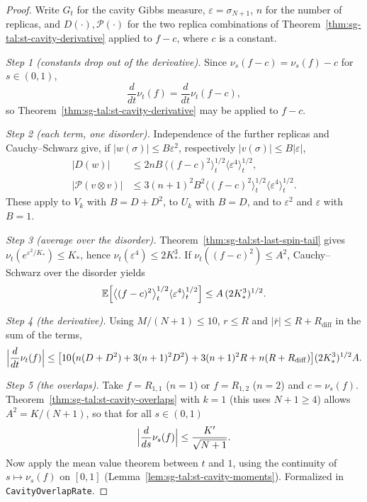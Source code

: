 \begin{proof}
  \leanok
Write $G_t$ for the cavity Gibbs measure, $\varepsilon=\sigma_{N+1}$, $n$ for the number of replicas, and
$D(\cdot),\mathcal P(\cdot)$ for the two replica combinations of
Theorem~\ref{thm:sg-tal:st-cavity-derivative} applied to $f-c$, where $c$ is a constant.

\emph{Step 1 (constants drop out of the derivative).} Since $\nu_s(f-c)=\nu_s(f)-c$ for $s\in(0,1)$,
\[
\frac d{dt}\nu_t(f)=\frac d{dt}\nu_t(f-c),
\]
so Theorem~\ref{thm:sg-tal:st-cavity-derivative} may be applied to $f-c$.

\emph{Step 2 (each term, one disorder).} Independence of the further replicas and Cauchy--Schwarz give, if
$|w(\sigma)|\le B\varepsilon^2$, respectively $|v(\sigma)|\le B|\varepsilon|$,
\begin{align*}
|D(w)|&\le2nB\,\bigl\langle(f-c)^2\bigr\rangle_t^{1/2}\langle\varepsilon^4\rangle_t^{1/2},\\
|\mathcal P(v\otimes v)|&\le3(n+1)^2B^2\bigl\langle(f-c)^2\bigr\rangle_t^{1/2}
  \langle\varepsilon^4\rangle_t^{1/2}.
\end{align*}
These apply to $V_k$ with $B=D+D^2$, to $U_k$ with $B=D$, and to $\varepsilon^2$ and $\varepsilon$ with $B=1$.

\emph{Step 3 (average over the disorder).} Theorem~\ref{thm:sg-tal:st-last-spin-tail} gives
$\nu_t(e^{\varepsilon^2/K_\ast})\le K_\ast$, hence $\nu_t(\varepsilon^4)\le2K_\ast^3$. If
$\nu_t((f-c)^2)\le A^2$, Cauchy--Schwarz over the disorder yields
\[
\mathbb E\Bigl[\bigl\langle(f-c)^2\bigr\rangle_t^{1/2}\langle\varepsilon^4\rangle_t^{1/2}\Bigr]
\le A\,(2K_\ast^3)^{1/2}.
\]

\emph{Step 4 (the derivative).} Using $M/(N+1)\le10$, $r\le R$ and $|\bar r|\le R+R_{\mathrm{diff}}$ in the sum
of the terms,
\[
\Bigl|\frac d{dt}\nu_t(f)\Bigr|\le\bigl[10\bigl(n(D+D^2)+3(n+1)^2D^2\bigr)+3(n+1)^2R
+n(R+R_{\mathrm{diff}})\bigr](2K_\ast^3)^{1/2}A .
\]

\emph{Step 5 (the overlaps).} Take $f=R_{1,1}$ ($n=1$) or $f=R_{1,2}$ ($n=2$) and $c=\nu_s(f)$.
Theorem~\ref{thm:sg-tal:st-cavity-overlaps} with $k=1$ (this uses $N+1\ge4$) allows
$A^2=K/(N+1)$, so that for all $s\in(0,1)$
\[
\Bigl|\frac d{ds}\nu_s(f)\Bigr|\le\frac{K'}{\sqrt{N+1}} .
\]
Now apply the mean value theorem between $t$ and $1$, using the continuity of $s\mapsto\nu_s(f)$ on $[0,1]$
(Lemma~\ref{lem:sg-tal:st-cavity-moments}).
Formalized in \texttt{CavityOverlapRate}.
\end{proof}

